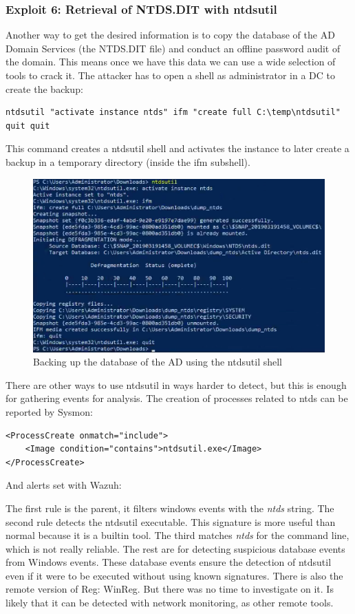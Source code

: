 \subsubsection{Exploit 6: Retrieval of NTDS.DIT with ntdsutil}
Another way to get the desired information is to copy the database of the AD Domain Services (the NTDS.DIT file) and conduct an offline password audit of the domain. This means once we have this data we can use a wide selection of tools to crack it\cite{ntdsdit_tools}\cite{extracting_ntds}\cite{ntds_powershell}.
\linej
\linej
The attacker has to open a shell as administrator in a DC to create the backup:
\begin{lstlisting}[style=PS,frame=none]
ntdsutil "activate instance ntds" ifm "create full C:\temp\ntdsutil" quit quit
\end{lstlisting}
\linej
This command creates a ntdsutil shell and activates the instance to later create a backup in a temporary directory (inside the ifm subshell).
\begin{figure}[H]
	\centering
	\includegraphics[width=\textwidth]{figuras/ntdsutil.png}
	\caption{Backing up the database of the AD using the ntdsutil shell}
\end{figure}
There are other ways to use ntdsutil in ways harder to detect\cite{more_dumps}, but this is enough for gathering events for analysis.
\linej
\linej
The creation of processes related to ntds can be reported by Sysmon:
\begin{lstlisting}[style=xml]
<ProcessCreate onmatch="include">
	<Image condition="contains">ntdsutil.exe</Image>
</ProcessCreate>
\end{lstlisting}
\linej
And alerts set with Wazuh:

\linej
The first rule is the parent, it filters windows events with the \textit{ntds} string.
\linej
The second rule detects the ntdsutil executable. This signature is more useful than normal because it is a builtin tool. The third matches \textit{ntds} for the command line, which is not really reliable.
\linej
The rest are for detecting suspicious database events from Windows events. These database events ensure the detection of ntdsutil even if it were to be executed without using known signatures.
\linej
\linej
There is also the remote version of Reg: WinReg. But there was no time to investigate on it. Is likely that it can be detected with network monitoring, as other remote tools.


